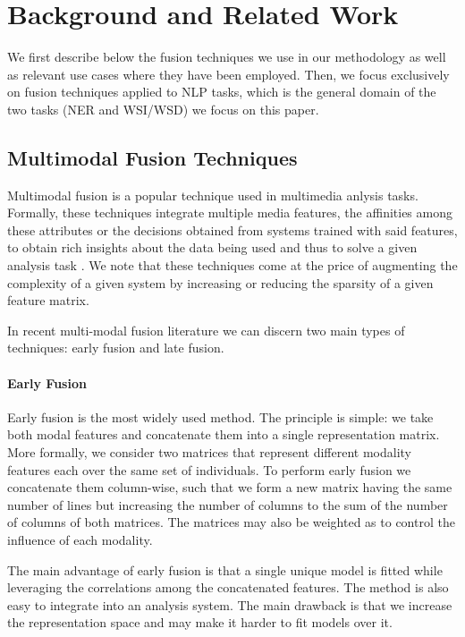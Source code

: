 \documentclass{llncs}
\begin{document}
\section{Background and Related Work}
 
We first describe below the fusion techniques we use in our methodology as well as relevant use cases where they have been employed. Then, we focus exclusively on fusion techniques applied to NLP tasks, which is the general domain of the two tasks (NER and WSI/WSD) we focus on this paper.                                                                                                                 
\subsection{Multimodal Fusion Techniques}
Multimodal fusion is a popular technique used in multimedia anlysis tasks. Formally, these techniques integrate multiple media features, the affinities among these attributes or the decisions obtained from systems trained with said features, to obtain rich insights about the data being used and thus to solve a given analysis  task \cite{AtreyHEK10}. We note that these techniques come at the price of augmenting the complexity of a given system by increasing or reducing the sparsity of a given feature matrix.


In recent multi-modal fusion literature we can discern two main types of techniques: early fusion and late fusion. 
\paragraph{Early Fusion}
Early fusion is the most widely used method. The principle is simple: we take both modal features and concatenate them into a single representation matrix. More formally, we consider two matrices  that represent different modality features each  over the same set of individuals. To perform early fusion we concatenate them column-wise, such that we form a new matrix having the same number of lines but increasing the number of columns to the sum of the number of columns of both matrices. The matrices may also be weighted as to control the influence of each modality.

The main advantage of early fusion is that a single unique model is fitted while leveraging the correlations among the concatenated features. The method is also easy to integrate into an analysis system. The main drawback is that we increase the representation space and may make it harder to fit models over it.
%
\end{document}
